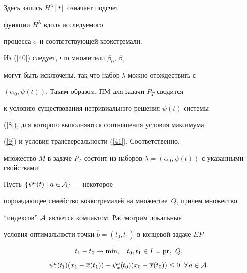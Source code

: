 Здесь запись $H^{\lambda} \left[t\right]$ означает подсчет


функции $H^{\lambda}$ вдоль исследуемого


процесса $\overline{\sigma}$ и соответствующей коэкстремали.





Из (\ref{40}) следует, что множители $\beta_0 $, $\beta_1$


могут быть исключены, так что набор $\lambda $ можно отождествить с


$(\alpha_0, \psi (t))$. Таким образом, ПМ для задачи $P_T $ сводится


к условию существования нетривиального решения $\psi (t)$ системы


(\ref{8}), для которого выполняются соотношения условия максимума


(\ref{9}) и условия трансверсальности (\ref{41}). Соответственно,


множество $M$ в задаче $P_T $ состоит из наборов $\lambda =(\alpha_0,


\psi (t))$ с указанными свойствами.





Пусть $\{\psi^a (t) \mid a\in {\cal A}\}$ --- некоторое


порождающее семейство коэкстремалей на множестве~$Q$, причем множество


``индексов'' ${\cal A}$ является компактом. Рассмотрим локальные


условия оптимальности точки $\overline{b}= (\overline{t}_0,


\overline{t}_1)$ в концевой задаче $EP$


\begin{equation}


\begin{array}{c}


t_1 -t_0 \rightarrow\min,\quad t_0,t_1 \in I=\PR_t ~Q,\\[3mm]


\psi_x^a (t_1)(x_1 -\overline{x}(t_1))-


\psi_x^a (t_0)(x_0 -\overline{x}(t_0


))\leq 0\ \; \forall\, a\in {\cal A}.


\end{array}


\label{42}


\end{equation}





